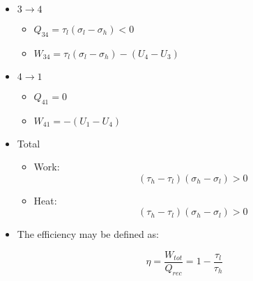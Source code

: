 \begin{itemize}
\begin{itemize}
      \item $3\to4$

        \begin{itemize}

          \item $Q_{34}=\tau_l(\sigma_l-\sigma_h)<0$

          \item $W_{34}=\tau_l(\sigma_l-\sigma_h)-(U_4-U_3)$

        \end{itemize}

      \item $4\to1$

        \begin{itemize}

          \item $Q_{41}=0$

          \item $W_{41}=-(U_1-U_4)$

        \end{itemize}

      \item Total

        \begin{itemize}

          \item Work: $$(\tau_h-\tau_l)(\sigma_h-\sigma_l)>0$$

          \item Heat: $$(\tau_h-\tau_l)(\sigma_h-\sigma_l)>0$$

        \end{itemize}

      \item The efficiency may be defined as:

        $$\eta=\frac{W_{tot}}{Q_{rec}}=1-\frac{\tau_l}{\tau_h}$$

    \end{itemize}

\end{itemize}





